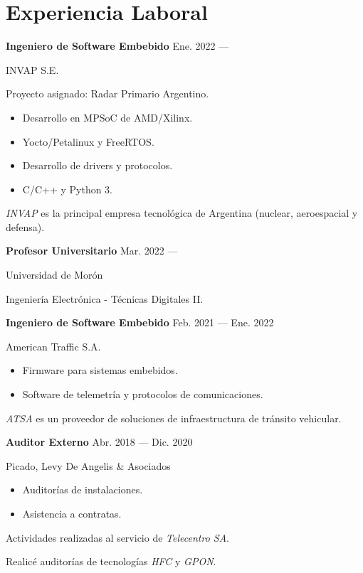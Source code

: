 \section{Experiencia Laboral}


\parbox[t][][t]{\linewidth}{
	\parbox{\linewidth}{
		\textbf{Ingeniero de Software Embebido}
			\hfill
			{Ene. 2022 --- \phantom{Dic. 2099}}
		}
	\smallbreak
	\parbox{\linewidth}{INVAP S.E.}
	\smallbreak
	Proyecto asignado: Radar Primario Argentino.
	\begin{itemize}
	    \item{Desarrollo en MPSoC de AMD/Xilinx.}
		\item{Yocto/Petalinux y FreeRTOS.}
		\item{Desarrollo de drivers y protocolos.}
		\item{C/C++ y Python 3.}
	\end{itemize}
	\smallbreak
    \emph{INVAP} es la principal empresa tecnológica de Argentina (nuclear, aeroespacial y defensa).
}

\bigskip
\parbox[t][][t]{\linewidth}{
	\parbox{\linewidth}{
		\textbf{Profesor Universitario}
			\hfill
			{Mar. 2022 --- \phantom{Dic. 2099}}
		}
	\smallbreak
	\parbox{\linewidth}{Universidad de Morón}
	\smallbreak
	Ingeniería Electrónica - Técnicas Digitales II.
}

\bigskip
\parbox[t][][t]{\linewidth}{
	\parbox{\linewidth}{
		\textbf{Ingeniero de Software Embebido}
			\hfill
			{Feb. 2021 --- Ene. 2022}
		}
	\smallbreak
	\parbox{\linewidth}{American Traffic S.A.}
	\smallbreak
	\begin{itemize}
	    \item{Firmware para sistemas embebidos.}
	    \item{Software de telemetría y protocolos de comunicaciones.}
	\end{itemize}
	\smallbreak
    \emph{ATSA} es un proveedor de soluciones de infraestructura de tránsito vehicular.
}

\bigskip
\parbox[t][][t]{\linewidth}{
	\parbox{\linewidth}{
		\textbf{Auditor Externo}
			\hfill
			{Abr. 2018 --- Dic. 2020}
		}
	\smallbreak
	\parbox{\linewidth}{Picado, Levy De Angelis \& Asociados}
	\smallbreak
	\begin{itemize}
	    \item{Auditorías de instalaciones.}
	    \item{Asistencia a contratas.}
	\end{itemize}
	\smallbreak
	Actividades realizadas al servicio de \emph{Telecentro SA}.

    Realicé auditorías de tecnologías \emph{HFC} y \emph{GPON}.
}

